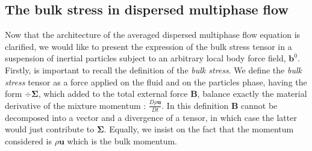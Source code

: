 

\subsection{The bulk stress in dispersed multiphase flow}


Now that the architecture of the averaged dispersed multiphase flow equation is clarified, we would like to present the expression of the bulk stress tensor in a suspension of inertial particles subject to an arbitrary local body force field, $\textbf{b}^0$.
Firstly, is important to recall the definition of the \textit{bulk stress}. 
We define the \textit{bulk stress} tensor as a force applied on the fluid and on the particles phase, having the form $\div \bm{\Sigma}$, which added to the total external force $\textbf{B}$, balance exactly the material derivative of the mixture momentum : $\frac{D \rho \textbf{u}}{Dt}$. 
In this definition $\textbf{B}$ cannot be decomposed into a vector and a divergence of a tensor, in which case the latter would just contribute to $\bm{\Sigma}$.
Equally, we insist on the fact that the momentum considered is $\rho\textbf{u}$ which is the bulk momentum. 

